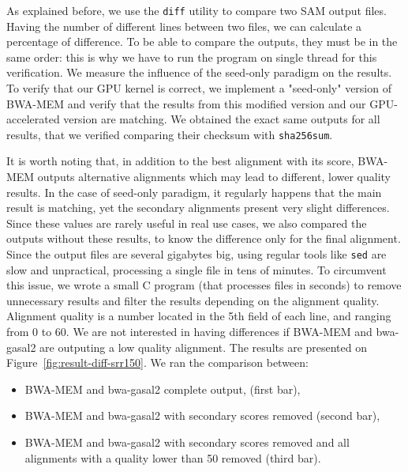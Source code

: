 
As explained before, we use the \verb|diff| utility to compare two SAM output files. Having the number of different lines between two files, we can calculate a percentage of difference. To be able to compare the outputs, they must be in the same order: this is why we have to run the program on single thread for this verification. We measure the influence of the seed-only paradigm on the results. To verify that our GPU kernel is correct, we implement a "seed-only" version of BWA-MEM and verify that the results from this modified version and our GPU-accelerated version are matching. We obtained the exact same outputs for all results, that we verified comparing their checksum with \verb|sha256sum|.

It is worth noting that, in addition to the best alignment with its score, BWA-MEM outputs alternative alignments which may lead to different, lower quality results. In the case of seed-only paradigm, it regularly happens that the main result is matching, yet the secondary alignments present very slight differences. Since these values are rarely useful in real use cases, we also compared the outputs without these results, to know the difference only for the final alignment. Since the output files are several gigabytes big, using regular tools like \verb|sed| are slow and unpractical, processing a single file in tens of minutes. To circumvent this issue, we wrote a small C program (that processes files in seconds) to remove unnecessary results and filter the results depending on the alignment quality. Alignment quality is a number located in the 5th field of each line, and ranging from 0 to 60. We are not interested in having differences if BWA-MEM and bwa-gasal2 are outputing a low quality alignment. The results are presented on Figure~\ref{fig:result-diff-srr150}. We ran the comparison between:
\begin{itemize}
    \item BWA-MEM and bwa-gasal2 complete output, (first bar),
    \item BWA-MEM and bwa-gasal2 with secondary scores removed (second bar),
    \item BWA-MEM and bwa-gasal2 with secondary scores removed and all alignments with a quality lower than 50 removed (third bar).
\end{itemize}{}


